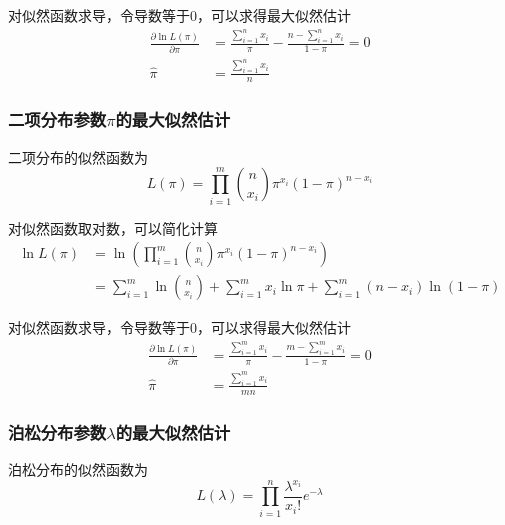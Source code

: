 对似然函数求导，令导数等于0，可以求得最大似然估计
\begin{equation}
    \begin{aligned}
        \frac{\partial \ln L(\pi)}{\partial \pi} & = \frac{\sum\limits_{i=1}^n x_i}{\pi} - \frac{n-\sum_{i=1}^n x_i}{1-\pi} = 0 \\
        \hat{\pi }                               & = \frac{\sum\limits_{i=1}^n x_i}{n}
    \end{aligned}
\end{equation}

\subsubsection{二项分布参数$\pi$的最大似然估计}

二项分布的似然函数为
\begin{equation}
    L(\pi) = \prod_{i=1}^m \binom{n}{x_i}\pi^{x_i}(1-\pi)^{n-x_i}
\end{equation}

对似然函数取对数，可以简化计算
\begin{equation}
    \begin{aligned}
        \ln L(\pi) & = \ln \left(\prod_{i=1}^m \binom{n}{x_i}\pi^{x_i}(1-\pi)^{n-x_i}\right)                       \\
                   & = \sum_{i=1}^m \ln \binom{n}{x_i} + \sum_{i=1}^m x_i \ln \pi + \sum_{i=1}^m (n-x_i)\ln(1-\pi)
    \end{aligned}
\end{equation}

对似然函数求导，令导数等于0，可以求得最大似然估计
\begin{equation}
    \begin{aligned}
        \frac{\partial \ln L(\pi)}{\partial \pi} & = \frac{\sum\limits_{i=1}^m x_i}{\pi} - \frac{m-\sum_{i=1}^m x_i}{1-\pi} = 0 \\
        \hat{\pi }                               & = \frac{\sum\limits_{i=1}^m x_i}{mn}
    \end{aligned}
\end{equation}

\subsubsection{泊松分布参数$\lambda$的最大似然估计}

泊松分布的似然函数为
\begin{equation}
    L(\lambda) = \prod_{i=1}^n \frac{\lambda^{x_i}}{x_i!}e^{-\lambda}
\end{equation}

